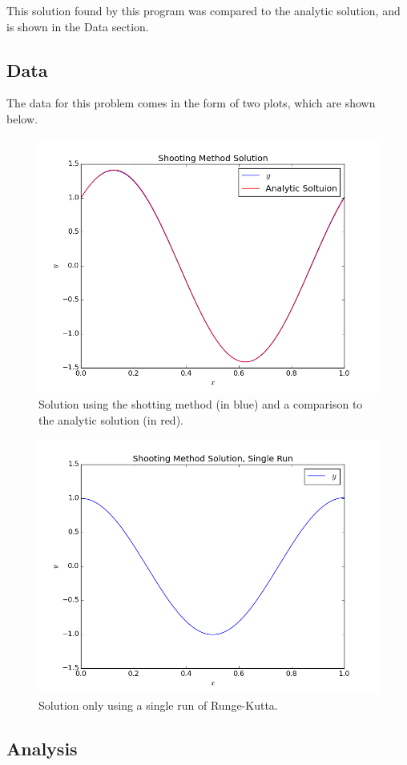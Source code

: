 \documentclass[10pt,letter]{article}
\begin{document}
This solution found by this program was compared to the analytic solution, and is shown in the Data section.
\subsection{Data}

The data for this problem comes in the form of two plots, which are shown below.

\begin{figure}[h]
  \centering
    \includegraphics[width=.7\textwidth]{homework6_problem2_plot1}
  \caption{Solution using the shotting method (in blue) and a comparison to the analytic solution (in red).}
\end{figure}
\begin{figure}[h]
  \centering
    \includegraphics[width=.7\textwidth]{homework6_problem2_plot2}
  \caption{Solution only using a single run of Runge-Kutta.}
\end{figure}

\subsection{Analysis}
\end{document}
